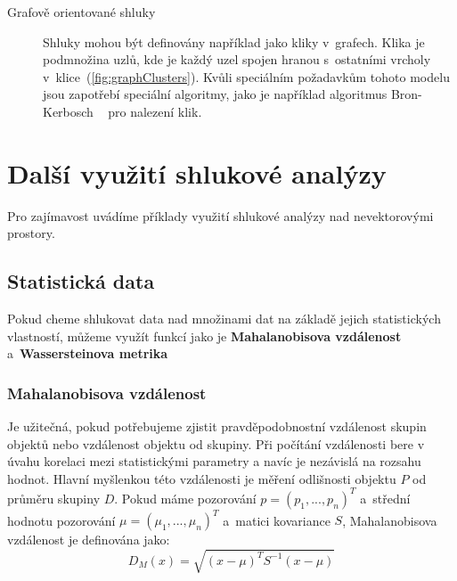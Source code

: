 \begin{description}
\item[Grafově orientované shluky] Shluky mohou být definovány například jako kli\-ky v~grafech. Klika je podmnožina uzlů, kde je každý uzel spojen hranou s~ostatními vrcholy v~klice~(\autoref{fig:graphClusters}).
Kvůli speciálním požadavkům tohoto modelu jsou zapotřebí speciální algoritmy, jako je například algoritmus Bron-Kerbosch ~\cite{Sun15} pro nalezení klik.
\end{description}

\section{Další využití shlukové analýzy} \label{sec:otherdata}
Pro zajímavost uvádíme příklady využití shlukové analýzy nad nevektorovými prostory.

\subsection{Statistická data}
Pokud cheme shlukovat data nad množinami dat na základě jejich statistických vlastností, můžeme využít funkcí jako je \textbf{Mahalanobisova vzdálenost} a~\textbf{Wassersteinova metrika}

\subsubsection{Mahalanobisova vzdálenost}
Je užitečná, pokud potřebujeme zjistit pravděpodobnostní vzdálenost skupin objektů nebo vzdálenost objektu od skupiny. Při počítání vzdálenosti bere v úvahu korelaci mezi statistickými parametry a navíc je nezávislá na rozsahu hodnot. Hlavní myšlenkou této vzdálenosti je měření odlišnosti objektu $P$ od průměru skupiny $D$.
Pokud máme pozorování $p = (p_1,..., p_n)^T$ a~střední hodnotu pozorování $\mu=(\mu_1,...,\mu_n)^T $ a~matici kovariance $S$, Mahalanobisova vzdálenost je definována jako:
$$D_M(x) = \sqrt{(x - \mu)^T S^{-1} (x-\mu)}$$

